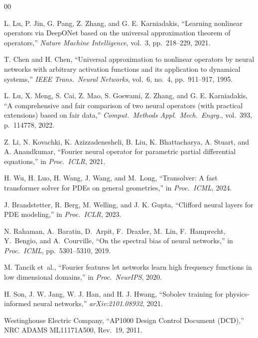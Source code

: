 \documentclass[conference]{IEEEtran}
\begin{document}
\begin{thebibliography}{00}

L. Lu, P. Jin, G. Pang, Z. Zhang, and G. E. Karniadakis,
``Learning nonlinear operators via DeepONet based on the universal approximation theorem of operators,''
\textit{Nature Machine Intelligence}, vol.~3, pp.~218--229, 2021.

T. Chen and H. Chen,
``Universal approximation to nonlinear operators by neural networks with arbitrary activation functions and its application to dynamical systems,''
\textit{IEEE Trans.\ Neural Networks}, vol.~6, no.~4, pp.~911--917, 1995.

L. Lu, X. Meng, S. Cai, Z. Mao, S. Goswami, Z. Zhang, and G. E. Karniadakis,
``A comprehensive and fair comparison of two neural operators (with practical extensions) based on fair data,''
\textit{Comput.\ Methods Appl.\ Mech.\ Engrg.}, vol.~393, p.~114778, 2022.

Z. Li, N. Kovachki, K. Azizzadenesheli, B. Liu, K. Bhattacharya, A. Stuart, and A. Anandkumar,
``Fourier neural operator for parametric partial differential equations,''
in \textit{Proc.\ ICLR}, 2021.

H. Wu, H. Luo, H. Wang, J. Wang, and M.~Long,
``Transolver: A fast transformer solver for PDEs on general geometries,''
in \textit{Proc.\ ICML}, 2024.

J. Brandstetter, R. Berg, M. Welling, and J. K. Gupta,
``Clifford neural layers for PDE modeling,''
in \textit{Proc.\ ICLR}, 2023.

N. Rahaman, A.~Baratin, D.~Arpit, F.~Draxler, M.~Lin, F.~Hamprecht, Y.~Bengio, and A.~Courville,
``On the spectral bias of neural networks,''
in \textit{Proc.\ ICML}, pp.~5301--5310, 2019.

M. Tancik et~al.,
``Fourier features let networks learn high frequency functions in low dimensional domains,''
in \textit{Proc.\ NeurIPS}, 2020.

H. Son, J. W. Jang, W. J. Han, and H. J. Hwang,
``Sobolev training for physics-informed neural networks,''
\textit{arXiv:2101.08932}, 2021.

Westinghouse Electric Company,
``AP1000 Design Control Document (DCD),''
NRC ADAMS ML11171A500, Rev.~19, 2011.


\end{thebibliography}
\end{document}
